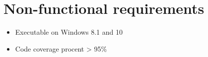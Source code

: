 \chapter{Non-functional requirements}

\begin{itemize}
	\item Executable on Windows 8.1 and 10
	\item Code coverage procent > 95\%
\end{itemize}
